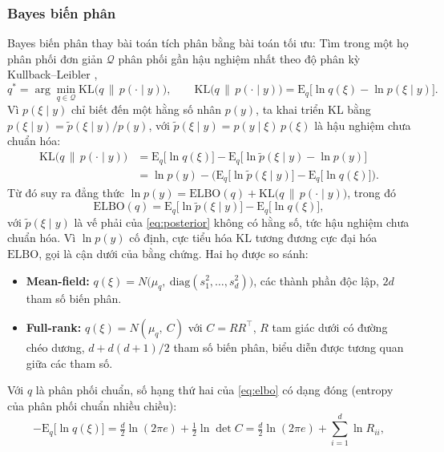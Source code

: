 \documentclass[12pt,a4paper]{article}
\theoremstyle{definition}
\theoremstyle{remark}
\newcommand{\E}{\mathrm{E}}
\newcommand{\ELBO}{\mathrm{ELBO}}
\newcommand{\KL}{\mathrm{KL}}
\newcommand{\Ncal}{N}
\begin{document}
\subsubsection{Bayes biến phân}

Bayes biến phân thay bài toán tích phân bằng bài toán tối ưu: Tìm trong một họ phân phối đơn giản $\mathcal Q$ phân phối gần hậu nghiệm nhất theo độ phân kỳ Kullback--Leibler \cite{blei2017},
\begin{equation}
q^{*}=\arg\min_{q\in\mathcal Q}\KL\big(q\,\|\,p(\cdot\mid y)\big),\qquad
\KL\big(q\,\|\,p(\cdot\mid y)\big)=\E_q\big[\ln q(\xi)-\ln p(\xi\mid y)\big].
\end{equation}
Vì $p(\xi\mid y)$ chỉ biết đến một hằng số nhân $p(y)$, ta khai triển KL bằng $p(\xi\mid y)=\tilde p(\xi\mid y)/p(y)$, với $\tilde p(\xi\mid y)=p(y\mid\xi)\,p(\xi)$ là hậu nghiệm chưa chuẩn hóa:
\begin{align*}
\KL\big(q\,\|\,p(\cdot\mid y)\big)
&=\E_q\big[\ln q(\xi)\big]-\E_q\big[\ln\tilde p(\xi\mid y)-\ln p(y)\big]\\
&=\ln p(y)-\Big(\E_q\big[\ln\tilde p(\xi\mid y)\big]-\E_q\big[\ln q(\xi)\big]\Big).
\end{align*}
Từ đó suy ra đẳng thức $\ln p(y)=\ELBO(q)+\KL\big(q\,\|\,p(\cdot\mid y)\big)$, trong đó
\begin{equation}\label{eq:elbo}
\ELBO(q)=\E_q\big[\ln\tilde p(\xi\mid y)\big]-\E_q\big[\ln q(\xi)\big],
\end{equation}
với $\tilde p(\xi\mid y)$ là vế phải của \eqref{eq:posterior} không có hằng số, tức hậu nghiệm chưa chuẩn hóa. Vì $\ln p(y)$ cố định, cực tiểu hóa $\KL$ tương đương cực đại hóa $\ELBO$, gọi là cận dưới của bằng chứng. Hai họ được so sánh:
\begin{itemize}
\item \textbf{Mean-field:} $q(\xi)=\Ncal\big(\mu_q,\ \mathrm{diag}(s_1^2,\dots,s_d^2)\big)$, các thành phần độc lập, $2d$ tham số biến phân.
\item \textbf{Full-rank:} $q(\xi)=\Ncal(\mu_q,\ C)$ với $C=RR^\top$, $R$ tam giác dưới có đường chéo dương, $d+d(d+1)/2$ tham số biến phân, biểu diễn được tương quan giữa các tham số.
\end{itemize}
Với $q$ là phân phối chuẩn, số hạng thứ hai của \eqref{eq:elbo} có dạng đóng (entropy của phân phối chuẩn nhiều chiều):
\begin{equation*}
-\E_q\big[\ln q(\xi)\big]=\tfrac d2\ln(2\pi e)+\tfrac12\ln\det C=\tfrac d2\ln(2\pi e)+\sum_{i=1}^{d}\ln R_{ii},
\end{equation*}
\end{document}
